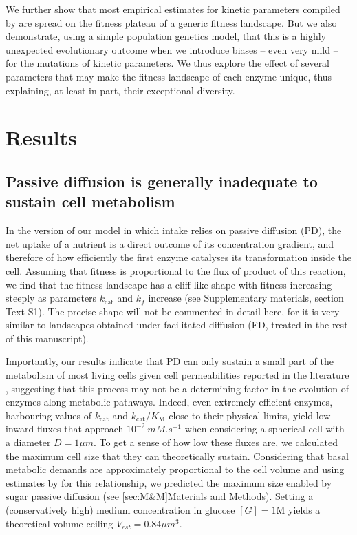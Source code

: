 \documentclass[11pt,onecolumn]{article}
\begin{document}
We further show that most empirical estimates for kinetic parameters compiled by \citet{Bar-Even11} are spread on the fitness plateau of a generic fitness landscape. But we also demonstrate, using a simple population genetics model, that this is a highly unexpected evolutionary outcome when we introduce biases -- even very mild -- for the mutations of kinetic parameters. We thus explore the effect of several parameters that may make the fitness landscape of each enzyme unique, thus explaining, at least in part, their exceptional diversity.

\section{Results\label{sec:Results}}

\subsection{Passive diffusion is generally inadequate to sustain cell metabolism}

In the version of our model in which intake relies on passive diffusion (PD), the net uptake of a nutrient is a direct outcome of its concentration gradient, and therefore of how efficiently the first enzyme catalyses its transformation inside the cell. Assuming that fitness is proportional to the flux of product of this reaction, we find that the fitness landscape has a cliff-like shape with fitness increasing steeply as parameters $k_\text{cat}$ and $k_f$ increase (see Supplementary materials, section Text S1). The precise shape will not be commented in detail here, for it is very similar to landscapes obtained under facilitated diffusion (FD, treated in the rest of this manuscript). 

Importantly, our results indicate that PD can only sustain a small part of the metabolism of most living cells given cell permeabilities reported in the literature \citep{Wood68,Milo10}, suggesting that this process may not be a determining factor in the evolution of enzymes along metabolic pathways. Indeed, even extremely efficient enzymes, harbouring values of $k_\text{cat}$ and $k_\text{cat}/K_\text{M}$ close to their physical limits, yield low inward fluxes that approach $10^{-2}~mM.s^{-1}$ when considering a spherical cell with a diameter $D=1 \mu m$. To get a sense of how low these fluxes are, we calculated the maximum cell size that they can theoretically sustain. Considering that basal metabolic demands are approximately proportional to the cell volume and using estimates by \citet{Lynch15} for this relationship, we predicted the maximum size enabled by sugar passive diffusion (see \ref{sec:M&M}Materials and Methods). Setting a (conservatively high) medium concentration in glucose $[G]=1$M yields a theoretical volume ceiling $V_{est}=0.84 \mu m^3$. 
\end{document}
